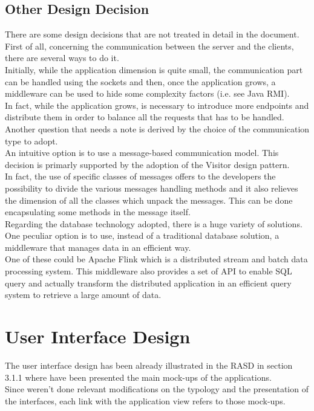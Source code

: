 \documentclass[a4paper]{article}
\begin{document}
\subsection{Other Design Decision}
There are some design decisions that are not treated in detail in the document. \\
First of all, concerning the communication between the server and the clients, there are several ways to do it. \\
Initially, while the application dimension is quite small, the communication part can be handled using the sockets and then, once the application grows, a middleware can be used to hide some complexity factors (i.e. see Java RMI).\\
In fact, while the application grows, is necessary to introduce more endpoints and distribute them in order to balance all the requests that has to be handled.\\
Another question that needs a note is derived by the choice of the communication type to adopt.\\
An intuitive option is to use a message-based communication model.
This decision is primarly supported by the adoption of the Visitor design pattern. \\
In fact, the use of specific classes of messages offers to the developers the possibility to divide the various messages handling methods and it also relieves the dimension of all the classes which unpack the messages. 
This can be done encapsulating some methods in the message itself.
\\ 
Regarding the database technology adopted, there is a huge variety of solutions.\\
One peculiar option is to use, instead of a traditional database solution, a middleware that manages data in an efficient way.\\
One of these could be Apache Flink which is a distributed stream and batch data processing system. This middleware also provides a set of API to enable SQL query and actually transform the distributed application in an efficient query system to retrieve a large amount of data.
\clearpage

\section{User Interface Design}
The user interface design has been already illustrated in the RASD in section 3.1.1 where have been presented the main mock-ups of the applications.\\
Since weren't done relevant modifications on the typology and the presentation of the interfaces, each link with the application view refers to those mock-ups. 
\vspace{.5cm}
\end{document}
